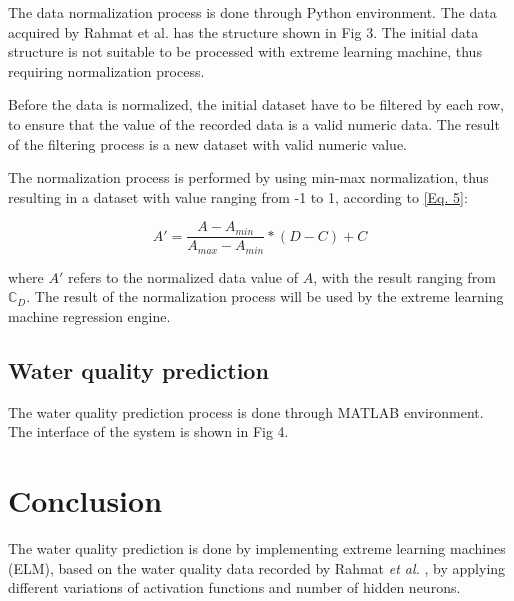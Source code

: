 \documentclass{ws-ijait}
\begin{document}
The data normalization process is done through Python environment. The data acquired by Rahmat et al.\cite{16} has the structure shown in Fig 3. The initial data structure is not suitable to be processed with extreme learning machine, thus requiring normalization process.

Before the data is normalized, the initial dataset have to be filtered by each row, to ensure that the value of the recorded data is a valid numeric data. The result of the filtering process is a new dataset with valid numeric value.

The normalization process is performed by using min-max normalization\cite{22}, thus resulting in a dataset with value ranging from -1 to 1, according to \eqref{Eq. 5}:

\begin{equation}
A' = \frac{A - A_{min}}{A_{max} - A_{min}} * (D - C) + C\label{Eq. 5}
\end{equation}

where $A'$ refers to the normalized data value of $A$, with the result ranging from $\mathbb{C}_{D}$. The result of the normalization process will be used by the extreme learning machine regression engine\cite{25}.

\subsection{Water quality prediction}

The water quality prediction process is done through MATLAB environment. The interface of the system is shown in Fig 4.




\section{Conclusion}

The water quality prediction is done by implementing extreme learning machines (ELM), based on the water quality data recorded by Rahmat {\it et al.}\cite{16} , by applying different variations of activation functions and number of hidden neurons.
\end{document}
